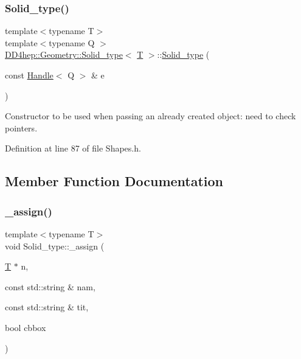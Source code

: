 \subsubsection{\texorpdfstring{Solid\+\_\+type()}{Solid\_type()}\hspace{0.1cm}{\footnotesize\ttfamily [5/5]}}
{\footnotesize\ttfamily template$<$typename T$>$ \\
template$<$typename Q $>$ \\
\hyperlink{class_d_d4hep_1_1_geometry_1_1_solid__type}{D\+D4hep\+::\+Geometry\+::\+Solid\+\_\+type}$<$ \hyperlink{class_t}{T} $>$\+::\hyperlink{class_d_d4hep_1_1_geometry_1_1_solid__type}{Solid\+\_\+type} (\begin{DoxyParamCaption}\item[{const \hyperlink{class_d_d4hep_1_1_handle}{Handle}$<$ Q $>$ \&}]{e }\end{DoxyParamCaption})\hspace{0.3cm}{\ttfamily [inline]}}



Constructor to be used when passing an already created object\+: need to check pointers. 



Definition at line 87 of file Shapes.\+h.



\subsection{Member Function Documentation}
\hypertarget{class_d_d4hep_1_1_geometry_1_1_solid__type_ac59f345548d169f3f773448ae6d67680}{}\label{class_d_d4hep_1_1_geometry_1_1_solid__type_ac59f345548d169f3f773448ae6d67680} 
\subsubsection{\texorpdfstring{\+\_\+assign()}{\_assign()}}
{\footnotesize\ttfamily template$<$typename T$>$ \\
void Solid\+\_\+type\+::\+\_\+assign (\begin{DoxyParamCaption}\item[{\hyperlink{class_t}{T} $\ast$}]{n,  }\item[{const std\+::string \&}]{nam,  }\item[{const std\+::string \&}]{tit,  }\item[{bool}]{cbbox }\end{DoxyParamCaption})\hspace{0.3cm}{\ttfamily [protected]}}



